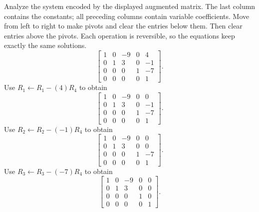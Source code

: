 \goal Analyze the system encoded by the displayed augmented matrix. The last column contains the constants; all preceding columns contain variable coefficients.
\idea Move from left to right to make pivots and clear the entries below them. Then clear entries above the pivots. Each operation is reversible, so the equations keep exactly the same solutions.
\[ \left[\begin{array}{rrrr|r}1&0&-9&0&4\\0&1&3&0&-1\\0&0&0&1&-7\\0&0&0&0&1\end{array}\right].\]
Use $R_{1}\leftarrow R_{1}-(4)R_{4}$ to obtain
\[ \left[\begin{array}{rrrr|r}1&0&-9&0&0\\0&1&3&0&-1\\0&0&0&1&-7\\0&0&0&0&1\end{array}\right].\]
Use $R_{2}\leftarrow R_{2}-(-1)R_{4}$ to obtain
\[ \left[\begin{array}{rrrr|r}1&0&-9&0&0\\0&1&3&0&0\\0&0&0&1&-7\\0&0&0&0&1\end{array}\right].\]
Use $R_{3}\leftarrow R_{3}-(-7)R_{4}$ to obtain
\[ \left[\begin{array}{rrrr|r}1&0&-9&0&0\\0&1&3&0&0\\0&0&0&1&0\\0&0&0&0&1\end{array}\right].\]

